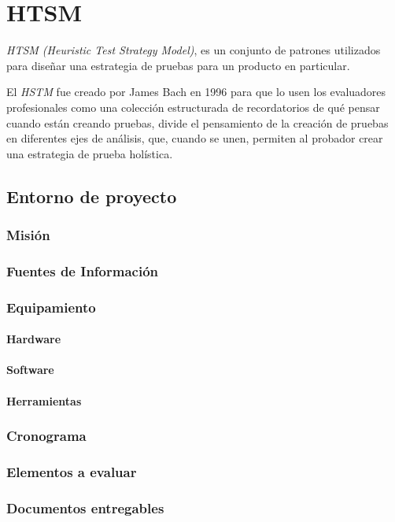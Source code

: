 \chapter{HTSM}

\emph{HTSM (Heuristic Test Strategy Model)}, es un conjunto de patrones
utilizados para diseñar una estrategia de pruebas para un producto en
particular.

El \emph{HSTM} fue creado por James Bach en 1996 para que lo usen los
evaluadores profesionales como una colección estructurada de recordatorios de
qué pensar cuando están creando pruebas, divide el pensamiento de la
creación de pruebas en diferentes ejes de análisis, que, cuando se unen,
permiten al probador crear una estrategia de prueba holística.

\section{Entorno de proyecto}
\subsection{Misión}
\subsection{Fuentes de Información}
\subsection{Equipamiento}
\subsubsection{Hardware}
\subsubsection{Software}
\subsubsection{Herramientas}
\subsection{Cronograma}
\subsection{Elementos a evaluar}
\subsection{Documentos entregables}
